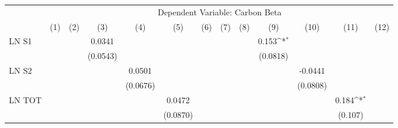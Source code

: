 {
\def\sym#1{\ifmmode^{#1}\else\(^{#1}\)\fi}
\begin{tabular}{l*{12}{c}}
\hline\hline
                    &\multicolumn{12}{c}{Dependent Variable: Carbon Beta}                                                                                                                                                                                                                   \\\cmidrule(lr){2-13}
                    &\multicolumn{1}{c}{(1)}         &\multicolumn{1}{c}{(2)}         &\multicolumn{1}{c}{(3)}         &\multicolumn{1}{c}{(4)}         &\multicolumn{1}{c}{(5)}         &\multicolumn{1}{c}{(6)}         &\multicolumn{1}{c}{(7)}         &\multicolumn{1}{c}{(8)}         &\multicolumn{1}{c}{(9)}         &\multicolumn{1}{c}{(10)}         &\multicolumn{1}{c}{(11)}         &\multicolumn{1}{c}{(12)}         \\
\hline
LN S1               &                     &                     &      0.0341         &                     &                     &                     &                     &                     &       0.153\sym{*}  &                     &                     &                     \\
                    &                     &                     &    (0.0543)         &                     &                     &                     &                     &                     &    (0.0818)         &                     &                     &                     \\
LN S2               &                     &                     &                     &      0.0501         &                     &                     &                     &                     &                     &     -0.0441         &                     &                     \\
                    &                     &                     &                     &    (0.0676)         &                     &                     &                     &                     &                     &    (0.0808)         &                     &                     \\
LN TOT              &                     &                     &                     &                     &      0.0472         &                     &                     &                     &                     &                     &       0.184\sym{*}  &                     \\
                    &                     &                     &                     &                     &    (0.0870)         &                     &                     &                     &                     &                     &     (0.107)         &                     \\

\end{tabular}}
